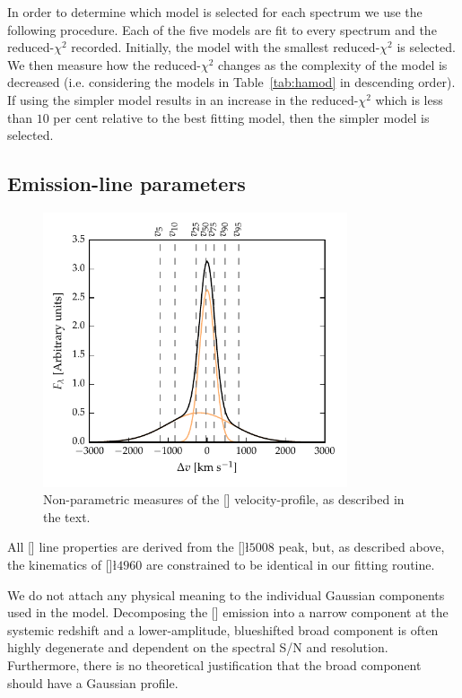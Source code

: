 In order to determine which model is selected for each spectrum we use the following procedure.
Each of the five models are fit to every spectrum and the reduced-$\chi^2$ recorded.
Initially, the model with the smallest reduced-$\chi^2$ is selected.
We then measure how the reduced-$\chi^2$ changes as the complexity of the model is decreased (i.e. considering the models in Table~\ref{tab:hamod} in descending order).
If using the simpler model results in an increase in the reduced-$\chi^2$ which is less than $10$ per cent relative to the best fitting model, then the simpler model is selected.

\subsection{Emission-line parameters}

\begin{figure}[t!]
    \centering
    \includegraphics[width=0.8\textwidth]{figures/chapter04/example_oiii.pdf}
    \caption[{Non-parametric measures of the [] velocity-profile.}]{Non-parametric measures of the [] velocity-profile, as described in the text.}
    \label{fig:example_oiii}
\end{figure}

All [] line properties are derived from the []\l$5008$ peak, but, as described above, the kinematics of []\l$4960$ are constrained to be identical in our fitting routine.

We do not attach any physical meaning to the individual Gaussian components used in the model.
Decomposing the [] emission into a narrow component at the systemic redshift and a lower-amplitude, blueshifted broad component is often highly degenerate and dependent on the spectral S/N and resolution.
Furthermore, there is no theoretical justification that the broad component should have a Gaussian profile.

